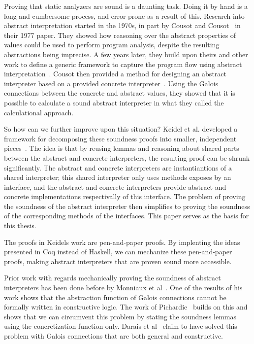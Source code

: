 Proving that static analyzers are sound is a daunting task. Doing it by hand is
a long and cumbersome process, and error prone as a result of this.
Research into abstract interpretation started in the 1970s, in part by Cousot 
and Cousot~\cite{cousot1977abstract} in their 1977 paper. They showed how 
reasoning over
the abstract properties of values could be used to perform program analysis,
despite the resulting abstractions being imprecise. A few years later, they
build upon theirs and other work to define a generic framework to capture the
program flow using abstract interpretation~\cite{cousot1979systematic}.
Cousot then provided a method for designing an abstract interpreter
based on a provided concrete interpreter~\cite{cousot1999calculational}.
Using the Galois connections between
the concrete and abstract values, they showed that it is possible to calculate 
a sound abstract interpreter in what they called the calculational approach.


So how can we further improve upon this situation? Keidel et al. developed a 
framework for decomposing these soundness proofs into smaller,
independent pieces~\cite{keidel2018compositional}.
The idea is that by reusing lemmas and reasoning about 
shared parts between the abstract and concrete interpreters, the resulting 
proof can be shrunk significantly. The abstract and concrete interpreters are 
instantiantions of a shared 
interpreter; this shared interpreter only uses methods exposes by an interface,
and the abstract and concrete interpreters provide abstract and concrete
implementations respectivally of this interface. The problem of proving the
soundness of the abstract interpreter then simplifies to proving the soundness
of the corresponding methods of the interfaces. This paper serves as the basis
for this thesis. 

The proofs in Keidels work are pen-and-paper proofs. By implenting the ideas
presented in Coq instead of Haskell, we can mechanize these pen-and-paper
proofs, making abstract interpreters that are proven sound more accessible.

Prior work with regards mechanically proving the soundness of abstract
interpreters has been done before by Monniaux et al~\cite{Monniaux3}. One of the
results of his work shows that the abstraction function of Galois connections
cannot be formally written in constructive logic. The work of 
Pichardie~\cite{pichardie2005interpretation} builds on this and shows that we
can circumvent this problem by stating the soundness lemmas using the
concretization function only. Darais et al~\cite{darais2016constructive} claim
to have solved this problem with Galois connections that are both general and
constructive.

